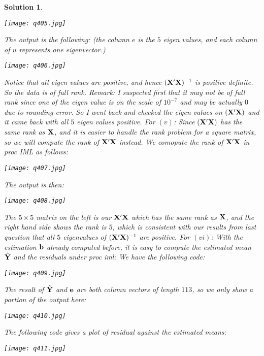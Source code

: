 \documentclass[11pt]{article}
\newtheorem{sol}{Solution}
\begin{document}
\begin{sol}
	\begin{center}
		\texttt{[image: q405.jpg]}
	\end{center}
	The output is the following:  (the column $e$ is the $5$ eigen values, and each column of $u$ represents one eigenvector.)
	\begin{center}
		\texttt{[image: q406.jpg]}
	\end{center}
	Notice that all eigen values are positive, and hence $({\bf X}'{\bf X})^{-1}$ is positive definite.\vskip 2mm
	So the data is of full rank.\vskip 2mm
	Remark: I suspected first that it may not be of full rank since one of the eigen value is on the scale of $10^{-7}$ and may be actually $0$ due to rounding error. So I went back and checked the eigen values on $({\bf X}'{\bf X})$ and it came back with all $5$ eigen values positive.\vskip 2mm
	For $(v)$:\vskip 2mm
	Since $({\bf X}'{\bf X})$ has the same rank as ${\bf X}$, and it is easier to handle the rank problem for a square matrix, so we will compute the rank of ${\bf X}'{\bf X}$ instead.\vskip 2mm
	We comopute the rank of ${\bf X}'{\bf X}$ in proc IML as follows:\vskip 2mm
	\begin{center}
		\texttt{[image: q407.jpg]}
	\end{center}
	The output is then:
	\begin{center}
		\texttt{[image: q408.jpg]}
	\end{center}
	The $5 \times 5$ matrix on the left is our ${\bf X}'{\bf X}$ which has the same rank as ${\bf X}$, and the right hand side shows the rank is $5$, which is consistent with our results from last question that all $5$ eigenvalues of $({\bf X}'{\bf X})^{-1}$ are positive.\vskip 2mm
	For $(vi)$:\vskip 2mm
	With the estimation ${\bf b}$ already computed before, it is easy to compute the estimated mean $\hat{{\bf Y}}$ and the residuals under proc iml: \vskip 2mm
	We have the following code:
	\begin{center}
		\texttt{[image: q409.jpg]}
	\end{center}
	The result of $\hat{{\bf Y}}$ and ${\bf e}$ are both column vectors of length $113$, so we only show a portion of the output here:
	\begin{center}
		\texttt{[image: q410.jpg]}
	\end{center}
	The following code gives a plot of residual against the estimated means:
	\begin{center}
		\texttt{[image: q411.jpg]}
	\end{center}

\end{sol}
\end{document}
